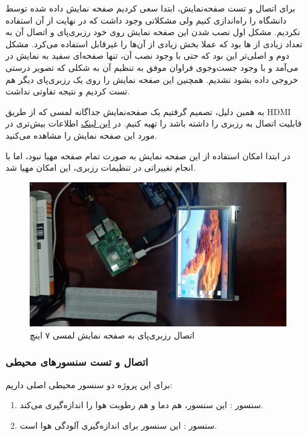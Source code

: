 \documentclass[12pt]{article}
\begin{document}
برای اتصال و تست صفحه‌نمایش، ابتدا سعی کردیم صفحه نمایش داده شده توسط دانشگاه را راه‌اندازی کنیم ولی مشکلاتی وجود داشت که در نهایت از آن استفاده نکردیم. مشکل اول نصب شدن این صفحه نمایش روی خود رزبری‌پای و اتصال آن به تعداد زیادی از  ها بود که عملا بخش زیادی از آن‌ها را غیرقابل استفاده می‌کرد. مشکل دوم و اصلی‌تر این بود که حتی با وجود نصب آن، تنها صفحه‌ای سفید به نمایش در می‌آمد و با وجود جست‌وجوی فراوان موفق به تنظیم آن به شکلی که تصویر درستی خروجی داده بشود نشدیم. همچنین این صفحه نمایش را روی یک رزبری‌پای دیگر هم تست کردیم و نتیجه تفاوتی نداشت.

به همین دلیل، تصمیم گرفتیم یک صفحه‌نمایش جداگانه لمسی که از طریق HDMI قابلیت اتصال به رزبری را داشته باشد را تهیه کنیم.
 در  
 \href{https://www.waveshare.com/wiki/7inch_HDMI_LCD_(B)}{این لینک}
 اطلاعات بیش‌تری در مورد این صفحه نمایش را مشاهده می‌کنید.
 
در ابتدا امکان استفاده از این صفحه نمایش به صورت تمام صفحه مهیا نبود، اما با انجام تغییراتی در تنظیمات رزبری، این امکان مهیا شد.

\begin{figure}[H]
	\begin{center}
		\includegraphics[width=.70\textwidth]{images/lcd.jpg}
	\end{center}
	\caption{اتصال رزبری‌پای به صفحه نمایش لمسی ۷ اینچ}
\end{figure}





\subsubsection{اتصال و تست سنسورهای محیطی} \label{environ}

برای این پروژه دو سنسور محیطی اصلی داریم:

\begin{enumerate}
	\item
 سنسور : این سنسور،‌ هم دما و هم رطوبت هوا را اندازه‌گیری می‌کند.


	\item 
سنسور : این سنسور برای اندازه‌گیری آلودگی هوا است.

\end{enumerate}
\end{document}
